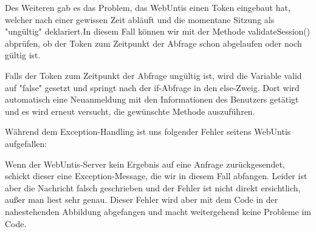 Des Weiteren gab es das Problem, das WebUntis einen Token eingebaut hat, welcher nach einer gewissen Zeit abläuft und die momentane Sitzung als "ungültig" deklariert.In diesem Fall können wir mit der Methode validateSession() abprüfen, ob der Token zum Zeitpunkt der Abfrage schon abgelaufen oder noch gültig ist. 



Falls der Token zum Zeitpunkt der Abfrage ungültig ist, wird die Variable valid auf "false" gesetzt und springt nach der if-Abfrage in den else-Zweig. Dort wird automatisch eine Neuanmeldung mit den Informationen des Benutzers getätigt und es wird erneut versucht, die gewünschte Methode auszuführen.

\pagebreak

Während dem Exception-Handling ist uns folgender Fehler seitens WebUntis aufgefallen:


Wenn der WebUntis-Server kein Ergebnis auf eine Anfrage zurückgesendet, schickt dieser eine Exception-Message, die wir in diesem Fall abfangen. Leider ist aber die Nachricht falsch geschrieben und der Fehler ist nicht direkt ersichtlich, außer man liest sehr genau. Dieser Fehler wird aber mit dem Code in der nahestehenden Abbildung abgefangen und macht weitergehend keine Probleme im Code.